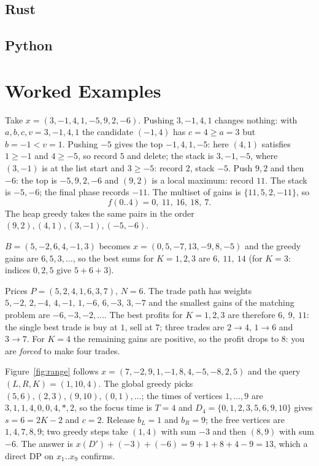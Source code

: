 \documentclass[11pt]{article}
\begin{document}
\codenote
\subsection{Rust}

\subsection{Python}

\section{Worked Examples}
\begin{examplebox}
Take $x=(3,-1,4,1,-5,9,2,-6)$. Pushing $3,-1,4,1$ changes nothing: with
$a,b,c,v=3,-1,4,1$ the candidate $(-1,4)$ has $c=4\ge a=3$ but $b=-1<v=1$. Pushing
$-5$ gives the top $-1,4,1,-5$: here $(4,1)$ satisfies $1\ge-1$ and
$4\ge-5$, so record $5$ and delete; the stack is $3,-1,-5$, where $(3,-1)$ is
at the list start and $3\ge-5$: record $2$, stack $-5$. Push $9,2$ and
then $-6$: the top is $-5,9,2,-6$ and $(9,2)$ is a local maximum:
record $11$. The stack is $-5,-6$; the final phase records $-11$. The
multiset of gains is $\{11,5,2,-11\}$, so
\[ f(0..4)=0,\ 11,\ 16,\ 18,\ 7 . \]
The heap greedy takes the same pairs in the order $(9,2),(4,1),(3,-1),(-5,-6)$.
\end{examplebox}

\begin{examplebox}
$B=(5,-2,6,4,-1,3)$ becomes $x=(0,5,-7,13,-9,8,-5)$ and the greedy gains are
$6,5,3,\dots$, so the best sums for $K=1,2,3$ are $6,\ 11,\ 14$
(for $K=3$: indices $0,2,5$ give $5+6+3$).
\end{examplebox}

\begin{examplebox}
Prices $P=(5,2,4,1,6,3,7)$, $N=6$. The trade path has weights
$5,-2,\,2,-4,\,4,-1,\,1,-6,\,6,-3,\,3,-7$ and the smallest gains of
the matching problem are $-6,-3,-2,\dots$. The best profits for
$K=1,2,3$ are therefore $6,\ 9,\ 11$: the single best trade is buy at $1$,
sell at $7$; three trades are $2\to4$, $1\to6$ and $3\to7$. For
$K=4$ the remaining gains are positive, so the profit drops to $8$: you
are \emph{forced} to make four trades.
\end{examplebox}

\begin{examplebox}
Figure~\ref{fig:range} follows $x=(7,-2,9,1,-1,8,4,-5,-8,2,5)$ and
the query $(L,R,K)=(1,10,4)$. The global greedy picks
$(5,6),(2,3),(9,10),(0,1),\dots$; the times of vertices $1,\dots,9$ are
$3,1,1,4,0,0,4,\ast,2$, so the focus time is $T=4$ and $D_4=\{0,1,2,3,5,6,9,10\}$ gives
$s=6=2K-2$ and $c=2$. Release $b_L=1$ and $b_R=9$; the free vertices
are $1,4,7,8,9$; two greedy steps take $(1,4)$ with sum $-3$ and then
$(8,9)$ with sum $-6$. The answer is
$x(D')+(-3)+(-6)=9+1+8+4-9=13$, which a direct DP on $x_1..x_9$ confirms.
\end{examplebox}
\end{document}
